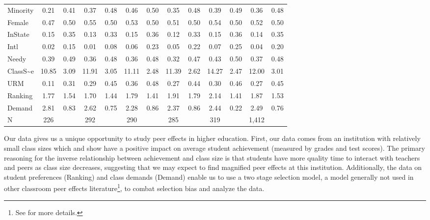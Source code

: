 \begin{sidewaystable}[b]
\begin{tabular}{l|c|c|c|c|c|c|c|c|c|c|c|c}
            Minority                 & 0.21  & 0.41 & 0.37  & 0.48 & 0.46  & 0.50 & 0.35  & 0.48 & 0.39  & 0.49 & 0.36  & 0.48 \\
            Female                   & 0.47  & 0.50 & 0.55  & 0.50 & 0.53  & 0.50 & 0.51  & 0.50 & 0.54  & 0.50 & 0.52  & 0.50 \\
            InState                  & 0.15  & 0.35 & 0.13  & 0.33 & 0.15  & 0.36 & 0.12  & 0.33 & 0.15  & 0.36 & 0.14  & 0.35 \\
            Intl                     & 0.02  & 0.15 & 0.01  & 0.08 & 0.06  & 0.23 & 0.05  & 0.22 & 0.07  & 0.25 & 0.04  & 0.20 \\
            Needy                    & 0.39  & 0.49 & 0.36  & 0.48 & 0.36  & 0.48 & 0.32  & 0.47 & 0.43  & 0.50 & 0.37  & 0.48 \\
            ClassS{\textasciitilde}e & 10.85 & 3.09 & 11.91 & 3.05 & 11.11 & 2.48 & 11.39 & 2.62 & 14.27 & 2.47 & 12.00 & 3.01 \\
            URM                      & 0.11  & 0.31 & 0.29  & 0.45 & 0.36  & 0.48 & 0.27  & 0.44 & 0.30  & 0.46 & 0.27  & 0.45 \\
            Ranking                  & 1.77  & 1.54 & 1.70  & 1.44 & 1.79  & 1.41 & 1.91  & 1.79 & 2.14  & 1.41 & 1.87  & 1.53 \\
            Demand                   & 2.81  & 0.83 & 2.62  & 0.75 & 2.28  & 0.86 & 2.37  & 0.86 & 2.44  & 0.22 & 2.49  & 0.76 \\
\hline
            N                        & 226   &      & 292   &      & 290   &      & 285   &      & 319   &      & 1,412        \\
\hline
\hline
\end{tabular}
\end{sidewaystable}

\clearpage{}

Our data gives us a unique opportunity to study peer effects in higher education.
First, our data comes from an institution with relatively small class sizes which \citet{diette2015class} and \citet{kokkelenberg2008effects} show have a positive impact on average student achievement (measured by grades and test scores).
The primary reasoning for the inverse relationship between achievement and class size is that students have more quality time to interact with teachers and peers as class size decreases, suggesting that we may expect to find magnified peer effects at this institution. 
Additionally, the data on student preferences (Ranking) and class demands (Demand) enable us to use a two stage selection model, a model generally not used in other classroom peer effects literature\footnote{See  for more details.}, to combat selection bias and analyze the data. 